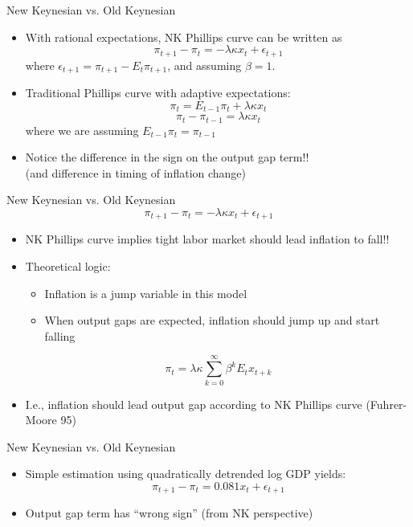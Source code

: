 \documentclass[10pt]{beamer}
\begin{document}
\begin{frame}{New Keynesian vs. Old Keynesian}
\begin{itemize}
\itemsep1em 
\item With rational expectations, NK Phillips curve can be written as
\[ \pi_{t+1} - \pi_{t} = -\lambda \kappa x_{t} + \epsilon_{t+1} \]
where $\epsilon_{t+1} = \pi_{t+1} - E_{t} \pi_{t+1}$, and assuming $\beta = 1$.
\item Traditional Phillips curve with adaptive expectations:
\[ \pi_{t} = E_{t-1} \pi_{t} + \lambda \kappa x_{t} \]
\[ \pi_{t} - \pi_{t-1} = \lambda \kappa x_{t} \]
where we are assuming $ E_{t-1} \pi_{t} = \pi_{t-1} $
\item Notice the difference in the sign on the output gap term!! \\ (and difference in timing of inflation change)
\end{itemize}
\end{frame}

\begin{frame}{New Keynesian vs. Old Keynesian}
\[ \pi_{t+1} - \pi_{t} = -\lambda \kappa x_{t} + \epsilon_{t+1} \] \vspace{-15pt}
\begin{itemize}
\itemsep1em 
\item NK Phillips curve implies tight labor market should lead inflation to fall!!
\item Theoretical logic: 
\begin{itemize}
\item Inflation is a jump variable in this model
\item When output gaps are expected, inflation should jump up and start falling
\end{itemize}
\[ \pi_{t} = \lambda \kappa \sum_{k=0}^{\infty} \beta^{k} E_{t} x_{t+k}  \]
\item I.e., inflation should lead output gap according to NK Phillips curve (Fuhrer-Moore 95)
\end{itemize}
\end{frame}

\begin{frame}{New Keynesian vs. Old Keynesian}
\begin{itemize}
\itemsep1em
\item Simple estimation using quadratically detrended log GDP yields:
\[ \pi_{t+1} - \pi_{t} = 0.081 x_{t} + \epsilon_{t+1}  \]
\item Output gap term has ``wrong sign'' (from NK perspective)
\end{itemize}
\end{frame}
\end{document}
